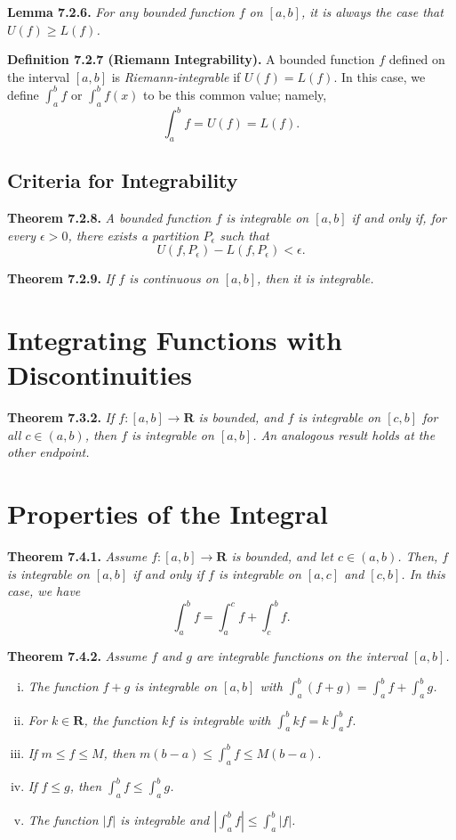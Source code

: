 \documentclass[12pt]{report}
\newcommand{\R}{\textbf{R}}
\begin{document}
\noindent \textbf{Lemma 7.2.6.} \textit{For any bounded function $f$ on $[a,b]$, it is always the case that $U(f)\geq L(f)$.}
\bigskip

\noindent \textbf{Definition 7.2.7 (Riemann Integrability).} A bounded function $f$ defined on the interval $[a,b]$ is \textit{Riemann-integrable} if $U(f)=L(f)$.  In this case, we define $\int_a^b f$ or $\int_a^b f(x)$ to be this common value; namely,
\[\int_a^bf=U(f)=L(f).\]
\bigskip

\subsection*{Criteria for Integrability}

\noindent \textbf{Theorem 7.2.8.} \textit{A bounded function $f$ is integrable on $[a,b]$ if and only if, for every $\epsilon>0$, there exists a partition $P_\epsilon$ such that}
\[U(f,P_\epsilon)-L(f,P_\epsilon)<\epsilon.\]
\bigskip

\noindent \textbf{Theorem 7.2.9.} \textit{If $f$ is continuous on $[a,b]$, then it is integrable.}
\bigskip

\section{Integrating Functions with Discontinuities}

\noindent \textbf{Theorem 7.3.2.} \textit{If $f:[a,b]\rightarrow\R$ is bounded, and $f$ is integrable on $[c,b]$ for all $c\in(a,b)$, then $f$ is integrable on $[a,b]$.  An analogous result holds at the other endpoint.}
\bigskip

\section{Properties of the Integral}

\noindent \textbf{Theorem 7.4.1.} \textit{Assume $f:[a,b]\rightarrow\R$ is bounded, and let $c\in(a,b)$.  Then, $f$ is integrable on $[a,b]$ if and only if $f$ is integrable on $[a,c]$ and $[c,b]$.  In this case, we have}
\[\int_a^bf=\int_a^cf+\int_c^bf.\]
\bigskip

\noindent \textbf{Theorem 7.4.2.} \textit{Assume $f$ and $g$ are integrable functions on the interval $[a,b]$.}

\begin{enumerate}[(i)]
\item \textit{The function $f+g$ is integrable on $[a,b]$ with $\int_a^b(f+g)=\int_a^bf+\int_a^bg$.}
\item \textit{For $k\in\R$, the function $kf$ is integrable with $\int_a^bkf=k\int_a^bf.$}
\item \textit{If $m\leq f\leq M$, then $m(b-a)\leq \int_a^bf\leq M(b-a)$.}
\item \textit{If $f\leq g$, then $\int_a^bf\leq\int_a^bg$.}
\item \textit{The function $|f|$ is integrable and $|\int_a^bf|\leq\int_a^b|f|$.}
\end{enumerate}
\bigskip
\end{document}
